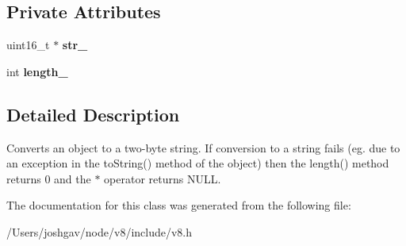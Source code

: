 \subsection*{Private Attributes}
\begin{DoxyCompactItemize}
\item 
uint16\+\_\+t $\ast$ {\bfseries str\+\_\+}\hypertarget{classv8_1_1_string_1_1_value_ac929f3bce35eb780a6f50ae0e8e286da}{}\label{classv8_1_1_string_1_1_value_ac929f3bce35eb780a6f50ae0e8e286da}

\item 
int {\bfseries length\+\_\+}\hypertarget{classv8_1_1_string_1_1_value_a616a68e7b525605cb2325990d660c900}{}\label{classv8_1_1_string_1_1_value_a616a68e7b525605cb2325990d660c900}

\end{DoxyCompactItemize}


\subsection{Detailed Description}
Converts an object to a two-\/byte string. If conversion to a string fails (eg. due to an exception in the to\+String() method of the object) then the length() method returns 0 and the $\ast$ operator returns N\+U\+LL. 

The documentation for this class was generated from the following file\+:\begin{DoxyCompactItemize}
\item 
/\+Users/joshgav/node/v8/include/v8.\+h\end{DoxyCompactItemize}
